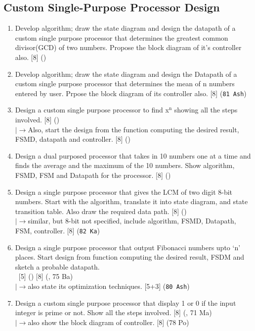 \documentclass[12pt]{article}
\newcommand{\lb}{\\$\left|\rightarrow\right.$}
\newcommand{\enter}{\\\textcolor{white}{1}}
\begin{document}
  \subsection{Custom Single-Purpose Processor Design}
    \begin{enumerate}[topsep=0pt]
      \item Develop algorithm; draw the state diagram and design the datapath of a custom single purpose processor that determines the greatest common divisor(GCD) of two numbers. Propose the block diagram of it's controller also. \hfill [8] ()
        
      \item Develop algorithm; draw the state diagram and design the Datapath of a custom single purpose processor that determines the mean of n numbers entered by user. Prpose the block diagram of its controller also. \hfill [8] (\texttt{81 Ash})
      
      \item Design a custom single purpose processor to find x$^\text{n}$ showing all the steps involved. \hfill [8] ()
      \lb Also, start the design from the function computing the desired result, FSMD, datapath and controller. \hfill [8] ()
      
      \item Design a dual purposed processor that takes in 10 numbers one at a time and finds the average and the maximum of the 10 numbers. Show algorithm, FSMD, FSM and Datapath for the processor. \hfill [8] ()
      
      \item Design a single purpose  processor that gives the LCM of two digit 8-bit numbers. Start with the algorithm, translate it into state diagram, and state transition table. Also draw the required data path. \hfill [8] ()
        \lb similar, but 8-bit not specified, include algorithm, FSMD, Datapath, FSM,  controller. \hfill [8] (\texttt{82 Ka})
      
      \item Design a single purpose processor that output Fibonacci numbers upto `n' places. Start design from function computing the desired result, FSDM and sketch a probable datapath.
        \enter\hfill [5] () [8] (, 75 Ba)
        \lb also state its optimization techniques. \hfill [5+3] (\texttt{80 Ash})
      
      \item Design a custom single purpose processor that display 1 or 0 if the input integer is prime or not. Show all the steps involved. \hfill [8] (, 71 Ma)
        \lb also show the block diagram of controller. \hfill [8] (78 Po)
      

\end{enumerate}
\end{document}
